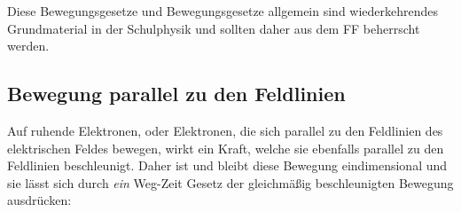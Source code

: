 




%
%	






\begin{Wichtig}
Diese Bewegungsgesetze und Bewegungsgesetze allgemein sind wiederkehrendes Grundmaterial in der Schulphysik und sollten daher \glqq aus dem FF\grqq{} beherrscht werden.
\end{Wichtig}

\subsection{Bewegung parallel zu den Feldlinien} \label{subsec:BewegungsgesetzParallel}

Auf ruhende Elektronen, oder Elektronen, die sich parallel zu den Feldlinien des elektrischen Feldes bewegen, wirkt ein Kraft, welche sie ebenfalls parallel zu den Feldlinien beschleunigt. Daher ist und bleibt diese Bewegung eindimensional und sie lässt sich durch \emph{ein} Weg-Zeit Gesetz der gleichmäßig beschleunigten Bewegung ausdrücken:

